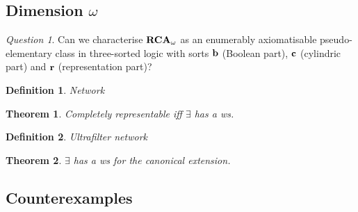 \documentclass{article}
\theoremstyle{defin}
\newtheorem{definition}{Definition}
\theoremstyle{theorem}
\newtheorem{theorem}{Theorem}
\theoremstyle{claim}
\theoremstyle{prop}
\theoremstyle{lemma}
\theoremstyle{fact}
\theoremstyle{remark}
\theoremstyle{ex}
\theoremstyle{col}
\theoremstyle{question}
\newtheorem{question}{Question}
\begin{document}
\subsection{Dimension $\omega$}

\begin{question}
Can we characterise ${\bf RCA}_{\omega}$ as an enumerably axiomatisable pseudo-elementary class in three-sorted logic with sorts ${\bf b}$ (Boolean part), ${\bf c}$ (cylindric part) and ${\bf r}$ (representation part)?
\end{question}


\begin{definition}
Network
\end{definition}

\begin{theorem}

Completely representable iff $\exists$ has a ws.
\end{theorem}

\begin{definition}
Ultrafilter network
\end{definition}

\begin{theorem}

$\exists$ has a ws for the canonical extension.

\end{theorem}

\subsection{Counterexamples}



\end{document}
